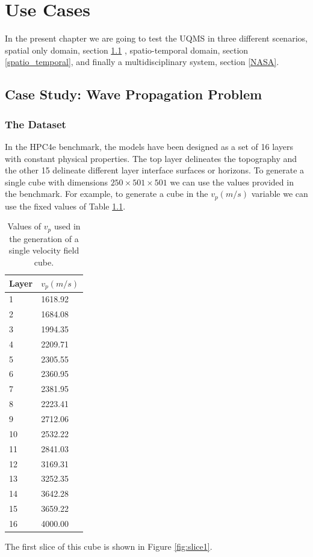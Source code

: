 \chapter[Use Cases]{Use Cases}\label{cap:use_cases}

In the present chapter we are going to test the UQMS in three different scenarios, spatial only domain, section \ref{Wave Propagation} , spatio-temporal domain, section \ref{spatio_temporal}, and finally a multidisciplinary system, section \ref{NASA}. 

\section{Case Study:  Wave Propagation Problem}\label{Wave Propagation}

\subsection{The Dataset}
In the HPC4e benchmark, the models have been designed as a set of 16 layers with constant physical properties. The top layer delineates the topography and the other 15 delineate different layer interface surfaces or horizons. To generate a single cube with dimensions $250\times501\times501$ we can use the values provided in the benchmark. For example, to generate a cube in the $v_{p}(m/s)$ variable we can use the fixed values of Table \ref{tab:valuesOfVp}.

\begin{table}
\begin{center}
    \begin{tabular}{|l|l|}
    \hline
    \textbf{Layer} & $v_{p}(m/s)$ \\ \hline
    1     & 1618.92 \\ \hline
    2     & 1684.08 \\ \hline
    3     & 1994.35 \\ \hline
    4     & 2209.71 \\ \hline
    5     & 2305.55 \\ \hline
    6     & 2360.95 \\ \hline
    7     & 2381.95 \\ \hline
    8     & 2223.41 \\ \hline
    9     & 2712.06 \\ \hline
    10    & 2532.22 \\ \hline
    11    & 2841.03 \\ \hline
    12    & 3169.31 \\ \hline
    13    & 3252.35 \\ \hline
    14    & 3642.28 \\ \hline
    15    & 3659.22 \\ \hline
    16    & 4000.00 \\ \hline
    \end{tabular}
    \caption {Values of $v_{p}$ used in the generation of a single velocity field cube.}
    \label{tab:valuesOfVp}
    \end{center}
\end{table}
The first slice of this cube is shown in Figure \ref{fig:slice1}.


